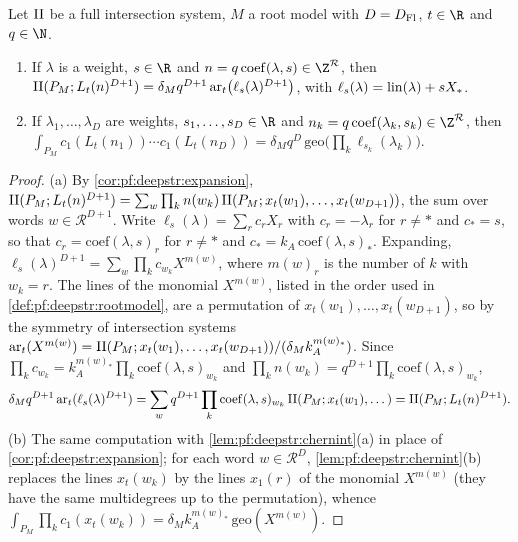 \begin{proposition}\label{prop:pf:deepstr:combroot}
Let $\mathrm{II}$ be a full intersection system, $M$ a root model with $D=D_{\mathrm{Fl}}$, $t\in\R$ and $q\in\N$.
\begin{enumerate}[label=(\alph*)]
\item If $\lambda$ is a weight, $s\in\R$ and $n=q\,\mathrm{coef}(\lambda,s)\in\Z^{\mathcal R}$, then
$\mathrm{II}(P_M;L_t(n)^{D+1})=\delta_Mq^{D+1}\,\mathrm{ar}_t\bigl(\ell_s(\lambda)^{D+1}\bigr)$, with $\ell_s(\lambda)=\operatorname{lin}(\lambda)+sX_\ast$.
\item If $\lambda_1,\dots,\lambda_D$ are weights, $s_1,\dots,s_D\in\R$ and $n_k=q\,\mathrm{coef}(\lambda_k,s_k)\in\Z^{\mathcal R}$,
then $\int_{P_M}c_1(L_t(n_1))\cdots c_1(L_t(n_D))=\delta_Mq^D\,\mathrm{geo}\bigl(\prod_k\ell_{s_k}(\lambda_k)\bigr)$.
\end{enumerate}
\end{proposition}

\begin{proof}
(a) By \cref{cor:pf:deepstr:expansion}, $\mathrm{II}(P_M;L_t(n)^{D+1})=\sum_w\prod_kn(w_k)\,\mathrm{II}(P_M;x_t(w_1),\dots,x_t(w_{D+1}))$,
the sum over words $w\in\mathcal R^{D+1}$. Write $\ell_s(\lambda)=\sum_rc_rX_r$ with $c_r=-\lambda_r$ for $r\ne\ast$ and
$c_\ast=s$, so that $c_r=\mathrm{coef}(\lambda,s)_r$ for $r\ne\ast$ and $c_\ast=k_A\,\mathrm{coef}(\lambda,s)_\ast$. Expanding,
$\ell_s(\lambda)^{D+1}=\sum_w\prod_kc_{w_k}X^{m(w)}$, where $m(w)_r$ is the number of $k$ with $w_k=r$. The lines of
the monomial $X^{m(w)}$, listed in the order used in \cref{def:pf:deepstr:rootmodel}, are a permutation of
$x_t(w_1),\dots,x_t(w_{D+1})$, so by the symmetry of intersection systems
$\mathrm{ar}_t(X^{m(w)})=\mathrm{II}(P_M;x_t(w_1),\dots,x_t(w_{D+1}))/(\delta_Mk_A^{m(w)_\ast})$. Since
$\prod_kc_{w_k}=k_A^{m(w)_\ast}\prod_k\mathrm{coef}(\lambda,s)_{w_k}$ and $\prod_kn(w_k)=q^{D+1}\prod_k\mathrm{coef}(\lambda,s)_{w_k}$,
\[
\delta_Mq^{D+1}\,\mathrm{ar}_t(\ell_s(\lambda)^{D+1})=\sum_wq^{D+1}\prod_k\mathrm{coef}(\lambda,s)_{w_k}\,
\mathrm{II}(P_M;x_t(w_1),\dots)=\mathrm{II}(P_M;L_t(n)^{D+1}).
\]
(b) The same computation with \cref{lem:pf:deepstr:chernint}(a) in place of \cref{cor:pf:deepstr:expansion};
for each word $w\in\mathcal R^D$, \cref{lem:pf:deepstr:chernint}(b) replaces the lines $x_t(w_k)$ by the lines
$x_1(r)$ of the monomial $X^{m(w)}$ (they have the same multidegrees up to the permutation), whence
$\int_{P_M}\prod_kc_1(x_t(w_k))=\delta_Mk_A^{m(w)_\ast}\,\mathrm{geo}(X^{m(w)})$.
\end{proof}

